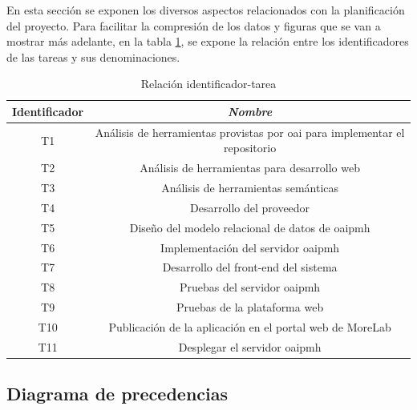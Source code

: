 En esta sección se exponen los diversos aspectos relacionados con la planificación del proyecto. Para facilitar la compresión de los datos y figuras que se van a mostrar más adelante, en la tabla \ref{tab:task_id_name}, se expone la relación entre los identificadores de las tareas y sus denominaciones.

\begin{table}[htp]
	\centering
	\caption{Relación identificador-tarea}\label{tab:task_id_name}
	\begin{tabular}{cc}
		\toprule
    	\textbf{Identificador} & \emph{Nombre}\\
    	\midrule
    	T1 & Análisis de herramientas provistas por \acrshort{oai} para implementar el repositorio\\
    	T2 & Análisis de herramientas para desarrollo web\\
    	T3 & Análisis de herramientas semánticas\\
    	T4 & Desarrollo del proveedor\\
    	T5 & Diseño del modelo relacional de datos de \acrshort{oaipmh}\\
    	T6 & Implementación del servidor \acrshort{oaipmh}\\
    	T7 & Desarrollo del front-end del sistema\\
    	T8 & Pruebas del servidor \acrshort{oaipmh}\\
    	T9 & Pruebas de la plataforma web\\
    	T10 & Publicación de la aplicación en el portal web de MoreLab\\
    	T11 & Desplegar el servidor \acrshort{oaipmh}\\
    	\bottomrule
    \end{tabular}
\end{table}

\subsection{Diagrama de precedencias}

